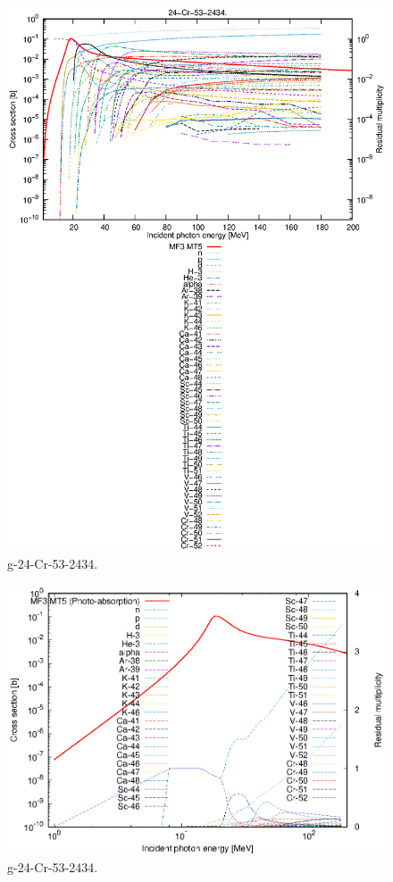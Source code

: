 \begin{figure}
 \includegraphics[width=\linewidth]{eps/g_24-Cr-53_2434.eps}
  \caption{g-24-Cr-53-2434.}
\end{figure}
\newpage \clearpage

\begin{figure}
 \includegraphics[width=\linewidth]{eps-log/g_24-Cr-53_2434.eps}
 \caption{g-24-Cr-53-2434.}
\end{figure}
\newpage \clearpage

